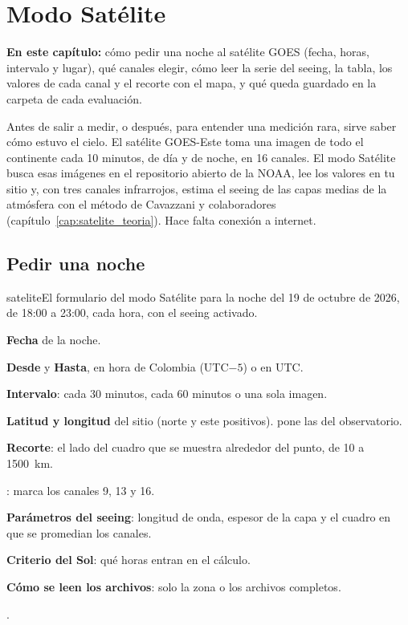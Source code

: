 \chapter{Modo Satélite}\label{cap:satelite}

\begin{resumen}
\textbf{En este capítulo:} cómo pedir una noche al satélite GOES (fecha, horas, intervalo y lugar), qué canales elegir,
cómo leer la serie del seeing, la tabla, los valores de cada canal y el recorte con el mapa, y qué queda guardado en la
carpeta de cada evaluación.
\end{resumen}

Antes de salir a medir, o después, para entender una medición rara, sirve saber cómo estuvo el cielo. El satélite
GOES-Este toma una imagen de todo el continente cada 10 minutos, de día y de noche, en 16 canales. El modo Satélite busca
esas imágenes en el repositorio abierto de la NOAA, lee los valores en tu sitio y, con tres canales infrarrojos, estima el
seeing de las capas medias de la atmósfera con el método de Cavazzani y colaboradores (capítulo~\ref{cap:satelite_teoria}).
Hace falta conexión a internet.

\section{Pedir una noche}

\begin{capturam}{satelite}{El formulario del modo Satélite para la noche del 19 de octubre de 2026, de 18:00 a 23:00, cada
hora, con el seeing activado.}
\item \textbf{Fecha} de la noche.
\item \textbf{Desde} y \textbf{Hasta}, en hora de Colombia (UTC$-5$) o en UTC.
\item \textbf{Intervalo}: cada 30 minutos, cada 60 minutos o una sola imagen.
\item \textbf{Latitud y longitud} del sitio (norte y este positivos).  pone las del observatorio.
\item \textbf{Recorte}: el lado del cuadro que se muestra alrededor del punto, de 10 a 1500~km.
\item {}: marca los canales 9, 13 y 16.
\item \textbf{Parámetros del seeing}: longitud de onda, espesor de la capa y el cuadro en que se promedian los canales.
\item \textbf{Criterio del Sol}: qué horas entran en el cálculo.
\item \textbf{Cómo se leen los archivos}: solo la zona o los archivos completos.
\item {}.
\end{capturam}

